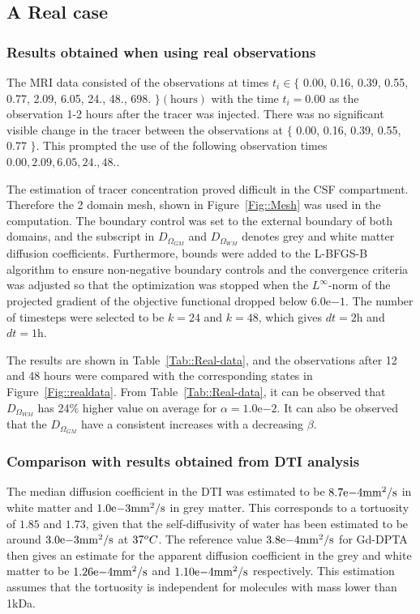 \documentclass[11pt,a4paper]{article}
\begin{document}
\subsection{A Real case} 

\subsubsection{Results obtained when using real observations}
The MRI data consisted of the observations at times $t_i \in \lbrace$ 0.00, 0.16, 0.39, 0.55, 0.77, 2.09, 6.05, 24., 48., 698. $\rbrace \mathrm{(hours)}$ with the time $t_i=0.00$ as the observation 1-2 hours after the tracer was injected. There was no significant visible change in the tracer between the observations at $\lbrace $ 0.00, 0.16, 0.39, 0.55, 0.77 $ \rbrace$. This prompted the use of the following observation times  $0.00, 2.09, 6.05, 24., 48.$. 

The estimation of tracer concentration proved difficult in the CSF compartment. Therefore the 2 domain mesh, shown in Figure~\ref{Fig::Mesh} was used in the computation. The boundary control was set to the external boundary of both domains, and the subscript in $D_{\Omega_{GM}}$ and $D_{\Omega_{WM}}$ denotes grey and white matter diffusion coefficients. Furthermore, bounds were added to the L-BFGS-B algorithm to ensure non-negative boundary controls and the convergence criteria was adjusted so that the optimization was stopped when the $L^\infty$-norm of the projected gradient of the objective functional dropped below $6.0\mathrm{e}{-1}$. The number of timesteps were selected to be $k=24$ and $k=48$, which gives $dt = 2 \mathrm{h}$ and $dt = 1 \mathrm{h}$.   

The results are shown in Table~\ref{Tab::Real-data}, and the observations after 12 and 48 hours were compared with the corresponding states in Figure~\ref{Fig::realdata}. From Table~\ref{Tab::Real-data}, it can be observed that $D_{\Omega_{WM}}$ has 24\% higher value on average for $\alpha =1.0\mathrm{e}{-2}$. It can also be observed that the $D_{\Omega_{GM}}$ have a consistent increases with a decreasing $\beta$.

\subsubsection{Comparison with results obtained from DTI analysis}
 
The median diffusion coefficient in the DTI was estimated to be $8.7\mathrm{e}{-4} \mathrm{mm\sp{2}/s}$ in white matter and $1.0\mathrm{e}{-3} \mathrm{mm\sp{2}/s}$ in grey matter. This corresponds to a tortuosity of $1.85$ and $1.73$, given that the self-diffusivity of water has been estimated to be around $3.0\mathrm{e}{-3}\mathrm{mm\sp{2}/s}$ at $37\sp{o}C$. The reference value $3.8\mathrm{e}{-4} \mathrm{mm\sp{2}/s}$ for Gd-DPTA then gives an estimate for the apparent diffusion coefficient in the grey and white matter to  be $ 1.26\mathrm{e}{-4}\mathrm{mm\sp{2}/s}$ and $1.10\mathrm{e}{-4} \mathrm{mm\sp{2}/s}$ respectively. This estimation assumes that the tortuosity is independent for molecules with mass lower than 1kDa. 
\end{document}
